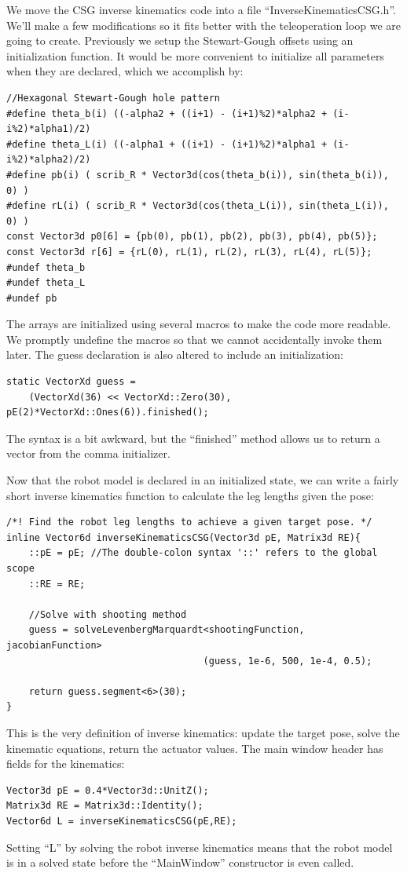 \documentclass[12pt]{article}
\begin{document}
We move the CSG inverse kinematics code into a file ``InverseKinematicsCSG.h''. We'll make a few modifications so it fits better with the teleoperation loop we are going to create. Previously we setup the Stewart-Gough offsets using an initialization function. It would be more convenient to initialize all parameters when they are declared, which we accomplish by:
\begin{lstlisting}
//Hexagonal Stewart-Gough hole pattern
#define theta_b(i) ((-alpha2 + ((i+1) - (i+1)%2)*alpha2 + (i-i%2)*alpha1)/2)
#define theta_L(i) ((-alpha1 + ((i+1) - (i+1)%2)*alpha1 + (i-i%2)*alpha2)/2)
#define pb(i) ( scrib_R * Vector3d(cos(theta_b(i)), sin(theta_b(i)), 0) )
#define rL(i) ( scrib_R * Vector3d(cos(theta_L(i)), sin(theta_L(i)), 0) )
const Vector3d p0[6] = {pb(0), pb(1), pb(2), pb(3), pb(4), pb(5)};
const Vector3d r[6] = {rL(0), rL(1), rL(2), rL(3), rL(4), rL(5)};
#undef theta_b
#undef theta_L
#undef pb
\end{lstlisting}
The arrays are initialized using several macros to make the code more readable. We promptly undefine the macros so that we cannot accidentally invoke them later. The guess declaration is also altered to include an initialization:
\begin{lstlisting}
static VectorXd guess =
    (VectorXd(36) << VectorXd::Zero(30), pE(2)*VectorXd::Ones(6)).finished();
\end{lstlisting}
The syntax is a bit awkward, but the ``finished'' method allows us to return a vector from the comma initializer.

Now that the robot model is declared in an initialized state, we can write a fairly short inverse kinematics function to calculate the leg lengths given the pose:
\begin{lstlisting}
/*! Find the robot leg lengths to achieve a given target pose. */
inline Vector6d inverseKinematicsCSG(Vector3d pE, Matrix3d RE){
    ::pE = pE; //The double-colon syntax '::' refers to the global scope
    ::RE = RE;

    //Solve with shooting method
    guess = solveLevenbergMarquardt<shootingFunction, jacobianFunction>
                                   (guess, 1e-6, 500, 1e-4, 0.5);

    return guess.segment<6>(30);
}
\end{lstlisting}
This is the very definition of inverse kinematics: update the target pose, solve the kinematic equations, return the actuator values. The main window header has fields for the kinematics:
\begin{lstlisting}
Vector3d pE = 0.4*Vector3d::UnitZ();
Matrix3d RE = Matrix3d::Identity();
Vector6d L = inverseKinematicsCSG(pE,RE);
\end{lstlisting}
Setting ``L'' by solving the robot inverse kinematics means that the robot model is in a solved state before the ``MainWindow'' constructor is even called.
\end{document}
